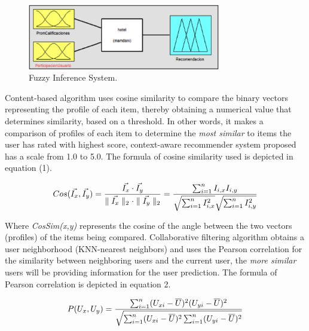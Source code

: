 \begin{figure}
\captionsetup{justification=centering,margin=2cm}
\centering

\setlength\fboxsep{0pt}
\setlength\fboxrule{0.7pt}
\includegraphics[width=0.75\textwidth]{img/fis.png}
\caption{Fuzzy Inference System.}
\label{fig:fis}       %
\end{figure}

Content-based algorithm uses cosine similarity to compare the binary vectors %
representing the profile of each item, thereby obtaining a numerical value that
determines similarity, based on a threshold. In other words, it makes a
comparison of profiles of each item to determine the \textit{most similar} to
items the user has rated with highest score, context-aware recommender system
proposed has a scale from 1.0 to 5.0. The formula of cosine similarity used is
depicted in equation (1).

\begin{equation}
\displaystyle %
 Cos (\vec{I_{x}}, \vec{I_{y}}) ={\vec{I_{x}} \cdot  \vec{I_{y}} \over \parallel \vec{I_{x}} \parallel_{2} \cdot \parallel \vec{I_{y}} \parallel_{2}} = {\sum_{i=1}^{n} I_{i,x} I_{i,y} \over \sqrt{\sum_{i=1}^{n} I_{i,x}^{2}} \sqrt{\sum_{i=1}^{n} I_{i,y}^{2}}} 
\end{equation}

Where \textit{CosSim(x,y)} represents the cosine of the angle between the two vectors
(profiles) of the items being compared. Collaborative filtering algorithm
obtains a user neighborhood (KNN-nearest neighbors) and uses the Pearson
correlation for the similarity between neighboring users and the current user,
the \textit{more similar} users will be providing information for the user prediction.
The formula of Pearson correlation \cite{ricci2011introduction} is depicted in equation 2.

\begin{equation}
\displaystyle
P(U_{x}, U_{y}) = {\sum_{i=1}^{n}(U_{xi} - \overline{U})^2 (U_{yi}- \overline{U})^2 \over \sqrt{\sum_{i=1}^{n}(U_{xi}- \overline{U})^2 \sum_{i=1}^{n}(U_{yi}- \overline{U})^2}}
\end{equation}
\\

